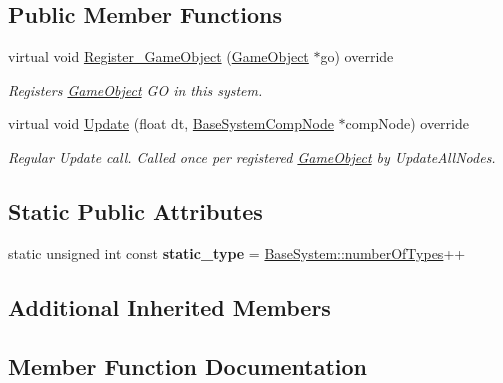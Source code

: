 \subsection*{Public Member Functions}
\begin{DoxyCompactItemize}
\item 
virtual void \hyperlink{classCameraSystem_a2cbe7b251450e9693cf49759fba120e6}{Register\+\_\+\+Game\+Object} (\hyperlink{classGameObject}{Game\+Object} $\ast$go) override
\begin{DoxyCompactList}\small\item\em Registers \hyperlink{classGameObject}{Game\+Object} GO in this system. \end{DoxyCompactList}\item 
virtual void \hyperlink{classCameraSystem_ab0ea25c2a8f704f0a0674a3bc61ddd68}{Update} (float dt, \hyperlink{structBaseSystemCompNode}{Base\+System\+Comp\+Node} $\ast$comp\+Node) override
\begin{DoxyCompactList}\small\item\em Regular Update call. Called once per registered \hyperlink{classGameObject}{Game\+Object} by Update\+All\+Nodes. \end{DoxyCompactList}\end{DoxyCompactItemize}
\subsection*{Static Public Attributes}
\begin{DoxyCompactItemize}
\item 
\mbox{\label{classCameraSystem_a321e590f18ebbd92290c3922d5c18924}} 
static unsigned int const {\bfseries static\+\_\+type} = \hyperlink{classBaseSystem_a7ef356edab3cfb02905e0a73a645b131}{Base\+System\+::number\+Of\+Types}++
\end{DoxyCompactItemize}
\subsection*{Additional Inherited Members}


\subsection{Member Function Documentation}
\mbox{\label{classCameraSystem_a2cbe7b251450e9693cf49759fba120e6}} 
